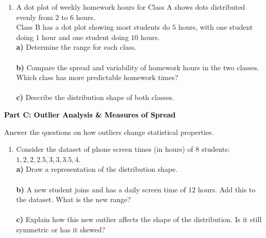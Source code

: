 \documentclass[12pt, letterpaper, fleqn]{article}
\newcommand{\blanklong}{\underline{\hspace{6.5cm}}}
\begin{document}
\vspace{5mm}

\begin{enumerate}[itemsep=2.5cm, leftmargin=0.6cm]
\item A dot plot of weekly homework hours for Class A shows dots distributed evenly from $2$ to $6$ hours. \\
Class B has a dot plot showing most students do $5$ hours, with one student doing $1$ hour and one student doing $10$ hours. \\
\textbf{a)} Determine the range for each class. \\
\blanklong \\
\textbf{b)} Compare the spread and variability of homework hours in the two classes. Which class has more predictable homework times? \\
\blanklong \\
\textbf{c)} Describe the distribution shape of both classes. \\
\blanklong
\end{enumerate}

\newpage

\begin{tcolorbox}[colback=black!10]
    \large\textcolor{black}{\textbf{Part C: Outlier Analysis \& Measures of Spread}}
\end{tcolorbox}

\vspace{3mm}

\noindent
Answer the questions on how outliers change statistical properties.

\vspace{5mm}

\begin{enumerate}[itemsep=2.5cm, leftmargin=0.6cm]
\item Consider the dataset of phone screen times (in hours) of 8 students: $1, 2, 2, 2.5, 3, 3, 3.5, 4$. \\
\textbf{a)} Draw a representation of the distribution shape. \\
\blanklong \\
\textbf{b)} A new student joins and has a daily screen time of $12$ hours. Add this to the dataset. What is the new range? \\
\blanklong \\
\textbf{c)} Explain how this new outlier affects the shape of the distribution. Is it still symmetric or has it skewed? \\
\blanklong
\end{enumerate}
\end{document}

